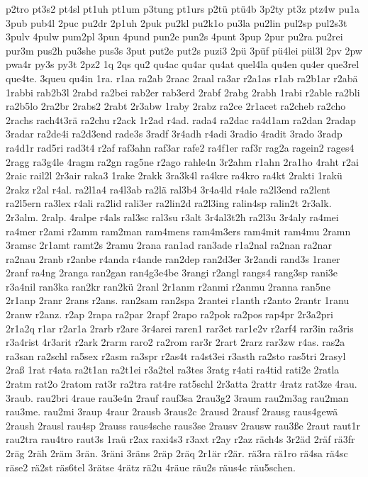 {p2tro
pt3s2
pt4sl
pt1uh
pt1um
p3tung
pt1urs
p2tü
ptü4b
3p2ty
pt3z
ptz4w
pu1a
3pub
pub4l
2puc
pu2dr
2p1uh
2puk
pu2kl
pu2k1o
pu3la
pu2lin
pul2sp
pul2s3t
3pulv
4pulw
pum2pl
3pun
4pund
pun2e
pun2s
4punt
3pup
2pur
pu2ra
pu2rei
pur3m
pus2h
pu3she
pus3s
3put
put2e
put2s
puzi3
2pü
3püf
pü4lei
pül3l
2pv
2pw
pwa4r
py3s
py3t
2pz2
1q
2qs
qu2
qu4ac
qu4ar
qu4at
quel4la
qu4en
qu4er
que3rel
que4te.
3queu
qu4in
1ra.
r1aa
ra2ab
2raac
2raal
ra3ar
r2a1as
r1ab
ra2b1ar
r2abä
1rabbi
rab2b3l
2rabd
ra2bei
rab2er
rab3erd
2rabf
2rabg
2rabh
1rabi
r2able
ra2bli
ra2b5lo
2ra2br
2rabs2
2rabt
2r3abw
1raby
2rabz
ra2ce
2r1acet
ra2cheb
ra2cho
2rachs
rach4t3rä
ra2chu
r2ack
1r2ad
r4ad.
rada4
ra2dac
ra4d1am
ra2dan
2radap
3radar
ra2de4i
ra2d3end
rade3s
3radf
3r4adh
r4adi
3radio
4radit
3rado
3radp
ra4d1r
rad5ri
rad3t4
r2af
raf3ahn
raf3ar
rafe2
ra4f1er
raf3r
rag2a
ragein2
rages4
2ragg
ra3g4le
4ragm
ra2gn
rag5ne
r2ago
rahle4n
3r2ahm
r1ahn
2ra1ho
4raht
r2ai
2raic
rail2l
2r3air
raka3
1rake
2rakk
3ra3k4l
ra4kre
ra4kro
ra4kt
2rakti
1rakü
2rakz
r2al
r4al.
ra2l1a4
ra4l3ab
ra2lä
ral3b4
3r4a4ld
r4ale
ra2l3end
ra2lent
ra2l5ern
ra3lex
r4ali
ra2lid
rali3er
ra2lin2d
ra2l3ing
ralin4sp
ralin2t
2r3alk.
2r3alm.
2ralp.
4ralpe
r4als
ral3sc
ral3su
r3alt
3r4al3t2h
ra2l3u
3r4aly
ra4mei
ra4mer
r2ami
r2amm
ram2man
ram4mens
ram4m3ers
ram4mit
ram4mu
2ramn
3ramsc
2r1amt
ramt2s
2ramu
2rana
ran1ad
ran3ade
r1a2nal
ra2nan
ra2nar
ra2nau
2ranb
r2anbe
r4anda
r4ande
ran2dep
ran2d3er
3r2andi
rand3s
1raner
2ranf
ra4ng
2ranga
ran2gan
ran4g3e4be
3rangi
r2angl
rangs4
rang3sp
rani3e
r3a4nil
ran3ka
ran2kr
ran2kü
2ranl
2r1anm
r2anmi
r2anmu
2ranna
ran5ne
2r1anp
2ranr
2rans
r2ans.
ran2sam
ran2spa
2rantei
r1anth
r2anto
2rantr
1ranu
2ranw
r2anz.
r2ap
2rapa
ra2par
2rapf
2rapo
ra2pok
ra2pos
rap4pr
2r3a2pri
2r1a2q
r1ar
r2ar1a
2rarb
r2are
3r4arei
raren1
rar3et
rar1e2v
r2arf4
rar3in
ra3ris
r3a4rist
4r3arit
r2ark
2rarm
raro2
ra2rom
rar3r
2rart
2rarz
rar3zw
r4as.
ras2a
ra3san
ra2schl
ra5sex
r2asm
ra3spr
r2as4t
ra4st3ei
r3asth
ra2sto
ras5tri
2rasyl
2raß
1rat
r4ata
ra2t1an
ra2t1ei
r3a2tel
ra3tes
3ratg
r4ati
ra4tid
rati2e
2ratla
2ratm
rat2o
2ratom
rat3r
ra2tra
rat4re
rat5schl
2r3atta
2rattr
4ratz
rat3ze
4rau.
3raub.
rau2bri
4raue
rau3e4n
2rauf
rauf3sa
2rau3g2
3raum
rau2m3ag
rau2man
rau3me.
rau2mi
3raup
4raur
2rausb
3raus2c
2rausd
2rausf
2rausg
raus4gewä
2raush
2rausl
rau4sp
2rauss
raus4sche
raus3se
2rausv
2rausw
rau3ße
2raut
raut1r
rau2tra
rau4tro
raut3s
1raü
r2ax
raxi4s3
r3axt
r2ay
r2az
räch4s
3r2äd
2räf
rä3fr
2räg
2räh
2räm
3rän.
3räni
3räns
2räp
2räq
2r1är
r2är.
rä3ra
rä1ro
rä4sa
rä4sc
räse2
rä2st
räs6tel
3rätse
4rätz
rä2u
4räue
räu2s
räus4c
räu5schen.
}
